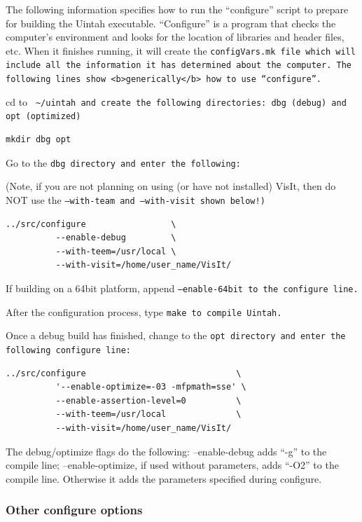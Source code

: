 \documentclass[12pt]{article}
\newcommand{\TT}[1]{\tt{#1} \normalfont}
\begin{document}
The following information specifies how to run the ``configure''
script to prepare for building the Uintah executable.  ``Configure''
is a program that checks the computer's environment and looks for the
location of libraries and header files, etc.  When it finishes
running, it will create the \TT{configVars.mk} file which will include all
the information it has determined about the computer.  The following
lines show <b>generically</b> how to use ``configure''.

cd to \TT{ \textasciitilde/uintah} and create the following directories:
\TT{dbg} (debug) and \TT{opt} (optimized)

\begin{verbatim}
mkdir dbg opt
\end{verbatim}

Go to the \TT{dbg} directory and enter the following:

(Note, if you are not planning on using (or have not installed) VisIt,
then do NOT use the \TT{--with-team} and \TT{--with-visit} shown below!)

\begin{verbatim}
../src/configure                 \
          --enable-debug         \
          --with-teem=/usr/local \
          --with-visit=/home/user_name/VisIt/
\end{verbatim}

If building on a 64bit platform, append \TT{--enable-64bit} to the
configure line.

After the configuration process, type \TT{make} to compile Uintah.

Once a debug build has finished, change to the \TT{opt} directory and
enter the following configure line:

\begin{verbatim}
../src/configure                              \
          '--enable-optimize=-03 -mfpmath=sse' \
          --enable-assertion-level=0          \
          --with-teem=/usr/local              \
          --with-visit=/home/user_name/VisIt/
\end{verbatim}

The debug/optimize flags do the following:  --enable-debug adds ``-g''
to the compile line; --enable-optimize, if used without parameters,
adds ``-O2'' to the compile line.  Otherwise it adds the parameters
specified during configure.

\subsubsection{Other configure options}
\end{document}
